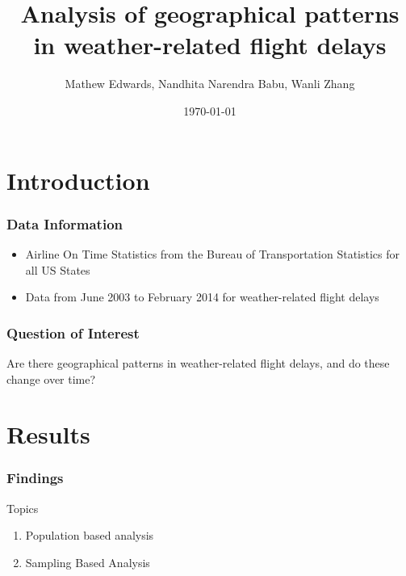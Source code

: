\documentclass{beamer}
\title{Analysis of  geographical patterns in weather-related flight delays}
\author{Mathew Edwards, Nandhita Narendra Babu, Wanli Zhang}
\date{\today}
\begin{document}
\begin{frame}
\titlepage
\end{frame}

\begin{frame}{\contentsname}
\tableofcontents
\end{frame}

\section{Introduction}

\begin{frame}
\frametitle{Data Information}
\begin{itemize}
\item Airline On Time Statistics from the Bureau of Transportation Statistics for all US States
\item Data from June 2003 to February 2014 for weather-related flight delays
\end{itemize}
\end{frame}

\begin{frame}
\frametitle{Question of Interest}
Are there geographical patterns in weather-related flight delays, and do these change over time?
\end{frame}

\section{Results}
\begin{frame}
\frametitle{Findings}
Topics 
\begin{enumerate}
\item Population based analysis 
\item Sampling Based Analysis
\end{enumerate}
\end{frame}
\end{document}

